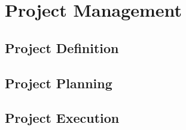 \section{Project Management} \label{sec:pm}


\subsection{Project Definition} \label{sec:Projectdefinition}





\subsection{Project Planning} \label{sec:ProjectPlanning}






\subsection{Project Execution} \label{sec:ProjectExecution}


